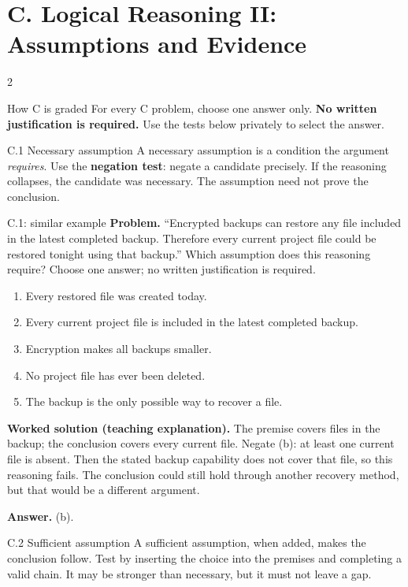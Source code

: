 \documentclass[10pt]{extarticle}
\newcommand{\term}[1]{\textbf{\color{ArgNavy}#1}}
\begin{document}
\clearpage
\small
\section*{C. Logical Reasoning II: Assumptions and Evidence}
\begin{multicols}{2}
\begin{definitionbox}{How C is graded}
For every C problem, choose one answer only. \textbf{No written justification is
required.} Use the tests below privately to select the answer.
\end{definitionbox}

\begin{methodbox}{C.1 Necessary assumption}
A necessary assumption is a condition the argument \emph{requires}. Use the
\term{negation test}: negate a candidate precisely. If the reasoning collapses,
the candidate was necessary. The assumption need not prove the conclusion.
\end{methodbox}

\begin{workedbox}{C.1: similar example}
\textbf{Problem.} ``Encrypted backups can restore any file included in the latest completed backup. Therefore every current project file could be restored tonight using that backup.'' Which assumption does this reasoning require? Choose one answer; no written justification is required.

\begin{enumerate}[label=(\alph*)]
\item Every restored file was created today.
\item Every current project file is included in the latest completed backup.
\item Encryption makes all backups smaller.
\item No project file has ever been deleted.
\item The backup is the only possible way to recover a file.
\end{enumerate}
\textbf{Worked solution (teaching explanation).} The premise covers files in the backup; the conclusion covers every current file. Negate (b): at least one current file is absent. Then the stated backup capability does not cover that file, so this reasoning fails. The conclusion could still hold through another recovery method, but that would be a different argument.

\textbf{Answer.} (b).
\end{workedbox}

\begin{methodbox}{C.2 Sufficient assumption}
A sufficient assumption, when added, makes the conclusion follow. Test by
inserting the choice into the premises and completing a valid chain. It may be
stronger than necessary, but it must not leave a gap.
\end{methodbox}


\end{multicols}
\end{document}
